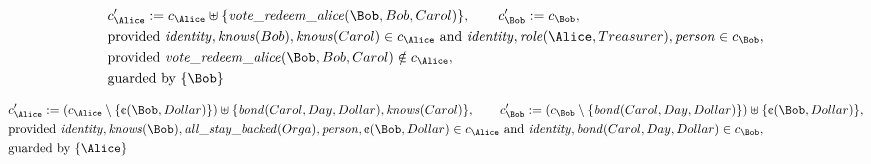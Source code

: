 \begin{align*}
&
c'_
{
\Alice
}
 := 
c_
{
\Alice
}
 \uplus 
\{
\mathit{\detokenize{
vote_redeem_alice
}}
(
\Bob
,
Bob
,
Carol
)
\}
, \qquad 
c'_
{
\Bob
}
 := 
c_
{
\Bob
}
,\\
&
\text{provided } 
\mathit{\detokenize{
identity
}}
,
\mathit{\detokenize{
knows
}}
(
Bob
)
,
\mathit{\detokenize{
knows
}}
(
Carol
)
 \in c_
{
\Alice
}
 \text{ and } 
\mathit{\detokenize{
identity
}}
,
\mathit{\detokenize{
role
}}
(
\Alice
,
Treasurer
)
,
\mathit{\detokenize{
person
}}
 \in c_
{
\Bob
}
,\\
&
\text{provided } 
\mathit{\detokenize{
vote_redeem_alice
}}
(
\Bob
,
Bob
,
Carol
)
 \notin c_
{
\Alice
}
,\\
&
\text{guarded by } \{
\Bob
\}
\end{align*}

\begin{align*}
&
c'_
{
\Alice
}
 := 
(c_
{
\Alice
}
 \setminus 
\{
\text{\textcent}
(
\Bob
,
Dollar
)
\}
) \uplus 
\{
\mathit{\detokenize{
bond
}}
(
Carol
,
Day
,
Dollar
)
,
\mathit{\detokenize{
knows
}}
(
Carol
)
\}
, \qquad 
c'_
{
\Bob
}
 := 
(c_
{
\Bob
}
 \setminus 
\{
\mathit{\detokenize{
bond
}}
(
Carol
,
Day
,
Dollar
)
\}
) \uplus 
\{
\text{\textcent}
(
\Bob
,
Dollar
)
\}
,\\
&
\text{provided } 
\mathit{\detokenize{
identity
}}
,
\mathit{\detokenize{
knows
}}
(
\Bob
)
,
\mathit{\detokenize{
all_stay_backed
}}
(
Orga
)
,
\mathit{\detokenize{
person
}}
,
\text{\textcent}
(
\Bob
,
Dollar
)
 \in c_
{
\Alice
}
 \text{ and } 
\mathit{\detokenize{
identity
}}
,
\mathit{\detokenize{
bond
}}
(
Carol
,
Day
,
Dollar
)
 \in c_
{
\Bob
}
,\\
&
\text{guarded by } \{
\Alice
\}
\end{align*}


